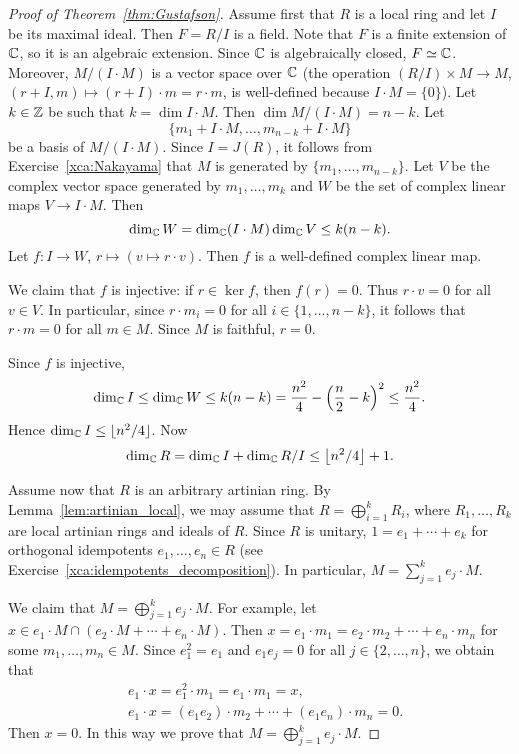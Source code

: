 \begin{proof}[Proof of Theorem~\ref{thm:Gustafson}]
    Assume first that $R$ is a local ring and let $I$ be its maximal ideal. Then 
    $F=R/I$ is a field. Note that $F$ is a finite extension of $\mathbb{C}$, so it is an algebraic extension. 
    Since $\mathbb{C}$ is algebraically closed, $F\simeq\mathbb{C}$. Moreover, 
    $M/(I\cdot M)$ is a vector space over $\mathbb{C}$ (the 
    operation $(R/I)\times M\to M$, $(r+I,m)\mapsto 
    (r+I)\cdot m=r\cdot m$, is well-defined because $I\cdot M=\{0\}$). Let $k\in\mathbb{Z}$ be such that 
    $k=\dim I\cdot M$. Then 
    $\dim M/(I\cdot M)=n-k$. Let  
    \[
        \{m_1+I\cdot M,\dots,m_{n-k} +I\cdot M\}
    \]
    be a basis of $M/(I\cdot M)$. 
    Since $I=J(R)$, it follows from Exercise~\ref{xca:Nakayama} that $M$ is generated by 
    $\{m_1,\dots,m_{n-k}\}$. Let $V$ be the complex vector space 
    generated by $m_1,\dots,m_k$ and $W$ be the set of complex linear maps 
    $V\to I\cdot M$. Then 
    \[
    \dim_{\mathbb{C}}W=\dim_{\mathbb{C}}(I\cdot M)\dim_{\mathbb{C}}V\leq k(n-k).
    \]
    Let $f\colon I\to W$, $r\mapsto (v\mapsto r\cdot v)$. Then $f$ is a well-defined complex linear map. 
    
    We claim that 
    $f$ is injective: if $r\in\ker f$, then $f(r)=0$. Thus $r\cdot v=0$ for all $v\in V$. In particular, since 
    $r\cdot m_i=0$ for all $i\in\{1,\dots,n-k\}$, it follows that $r\cdot m=0$ for all $m\in M$. 
    Since $M$ is faithful, $r=0$. 

    Since $f$ is injective, 
    \[
    \dim_{\mathbb{C}} I\leq\dim_{\mathbb{C}}W\leq k(n-k)=\frac{n^2}{4}-\left(\frac{n}{2}-k\right)^2\leq\frac{n^2}{4}.
    \]
    Hence $\dim_{\mathbb{C}}I\leq\lfloor n^2/4\rfloor$. Now 
    \[
    \dim_{\mathbb{C}}R=\dim_{\mathbb{C}}I+\dim_{\mathbb{C}}R/I\leq \left\lfloor n^2/4\right\rfloor+1. 
    \]

    Assume now that $R$ is an arbitrary artinian ring. By Lemma~\ref{lem:artinian_local}, we may assume
    that $R=\bigoplus_{i=1}^k R_i$, where $R_1,\dots,R_k$ are local artinian rings and ideals of $R$. Since $R$ is unitary, $1=e_1+\cdots+e_k$ 
    for orthogonal idempotents $e_1,\dots,e_n\in R$ 
    (see Exercise~\ref{xca:idempotents_decomposition}). 
    In particular,  
    $M=\sum_{j=1}^k e_j\cdot M$. 

    We claim that $M=\bigoplus_{j=1}^k e_j\cdot M$. For example, let $x\in e_1\cdot M\cap (e_2\cdot M+\cdots+e_n\cdot M)$. Then 
    $x=e_1\cdot m_1=e_2\cdot m_2+\cdots+e_n\cdot m_n$ 
    for some $m_1,\dots,m_n\in M$. Since $e_1^2=e_1$ and 
    $e_1e_j=0$ for all $j\in\{2,\dots,n\}$, we obtain that 
    \begin{align*}
        &e_1\cdot x=e_1^2\cdot m_1=e_1\cdot m_1=x,\\
        &e_1\cdot x=(e_1e_2)\cdot m_2+\cdots+(e_1e_n)\cdot m_n=0.
    \end{align*}
    Then $x=0$. In this way we prove that $M=\bigoplus_{j=1}^k e_j\cdot M$. 
    

\end{proof}
